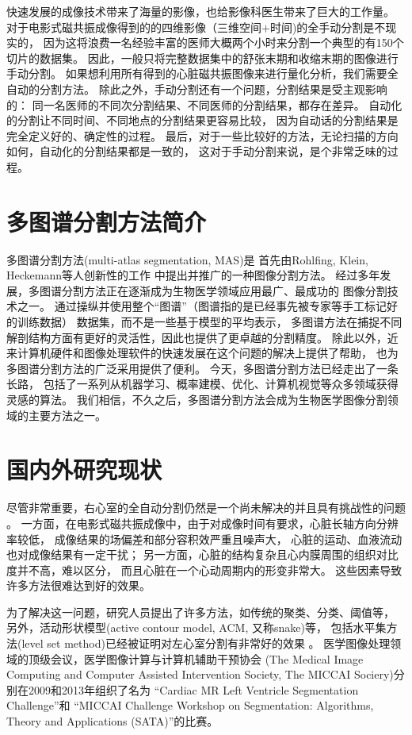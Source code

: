 快速发展的成像技术带来了海量的影像，也给影像科医生带来了巨大的工作量。
对于电影式磁共振成像得到的的四维影像（三维空间$+$时间)的全手动分割是不现实的，
因为这将浪费一名经验丰富的医师大概两个小时来分割一个典型的有150个切片的数据集。
因此，一般只将完整数据集中的舒张末期和收缩末期的图像进行手动分割。
如果想利用所有得到的心脏磁共振图像来进行量化分析，我们需要全自动的分割方法。
除此之外，手动分割还有一个问题，分割结果是受主观影响的：
同一名医师的不同次分割结果、不同医师的分割结果，都存在差异。
自动化的分割让不同时间、不同地点的分割结果更容易比较，
因为自动话的分割结果是完全定义好的、确定性的过程。
最后，对于一些比较好的方法，无论扫描的方向如何，自动化的分割结果都是一致的，
这对于手动分割来说，是个非常乏味的过程。


\section{多图谱分割方法简介}
多图谱分割方法(multi-atlas segmentation, MAS)是
首先由Rohlfing, Klein, Heckemann等人创新性的工作
中提出并推广的一种图像分割方法。
经过多年发展，多图谱分割方法正在逐渐成为生物医学领域应用最广、最成功的
图像分割技术之一。
通过操纵并使用整个``图谱''（图谱指的是已经事先被专家等手工标记好的训练数据）
数据集，而不是一些基于模型的平均表示，
多图谱方法在捕捉不同解剖结构方面有更好的灵活性，因此也提供了更卓越的分割精度。
除此以外，近来计算机硬件和图像处理软件的快速发展在这个问题的解决上提供了帮助，
也为多图谱分割方法的广泛采用提供了便利。
今天，多图谱分割方法已经走出了一条长路，
包括了一系列从机器学习、概率建模、优化、计算机视觉等众多领域获得灵感的算法。
我们相信，不久之后，多图谱分割方法会成为生物医学图像分割领域的主要方法之一。


\section{国内外研究现状}

尽管非常重要，右心室的全自动分割仍然是一个尚未解决的并且具有挑战性的问题
。
一方面，在电影式磁共振成像中，由于对成像时间有要求，心脏长轴方向分辨率较低，
成像结果的场偏差和部分容积效严重且噪声大，
心脏的运动、血液流动也对成像结果有一定干扰；
另一方面，心脏的结构复杂且心内膜周围的组织对比度并不高，难以区分，
而且心脏在一个心动周期内的形变非常大。
这些因素导致许多方法很难达到好的效果。

为了解决这一问题，研究人员提出了许多方法，如传统的聚类、分类、阈值等，
另外，活动形状模型(active contour model, ACM, 又称snake)等，
包括水平集方法(level set method)已经被证明对左心室分割有非常好的效果
。
医学图像处理领域的顶级会议，医学图像计算与计算机辅助干预协会
(The Medical Image Computing and Computer Assisted Intervention Society,
The MICCAI Sociery)分别在2009和2013年组织了名为
``Cardiac MR Left Ventricle Segmentation Challenge''和
``MICCAI Challenge Workshop on Segmentation:
Algorithms, Theory and Applications (SATA)''的比赛。

